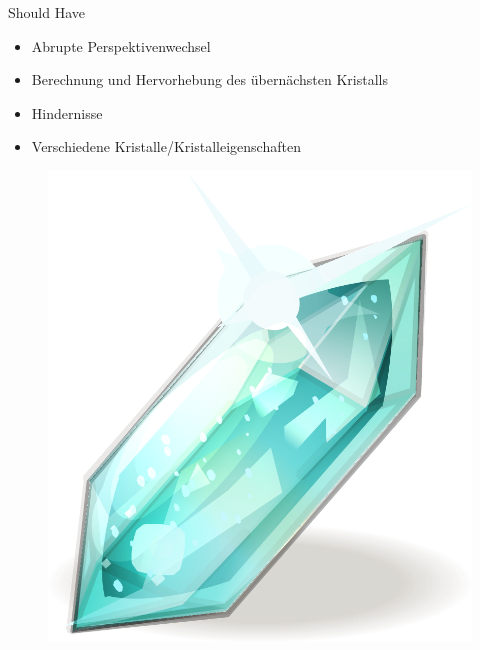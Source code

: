 \slideonetoone
{Should Have}
	{
		\begin{itemize}
			\item Abrupte Perspektivenwechsel
			\item Berechnung und Hervorhebung des übernächsten Kristalls
			\item Hindernisse
			\item Verschiedene Kristalle/Kristalleigenschaften
		\end{itemize}
		\begin{figure}
			\centering
			\includegraphics[width=\textwidth, height=0.35\textheight, keepaspectratio]{images/Resonanz-Kristall}
		\end{figure}
	}
